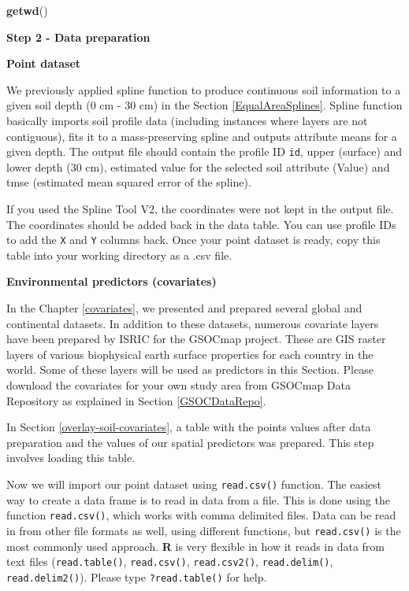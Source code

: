 \documentclass[10pt,b5paper,]{book}
\newenvironment{Shaded}{\begin{snugshade}}{\end{snugshade}}
\newcommand{\KeywordTok}[1]{\textcolor[rgb]{0.13,0.29,0.53}{\textbf{#1}}}
\newcommand{\NormalTok}[1]{#1}
\theoremstyle{definition}
\theoremstyle{definition}
\theoremstyle{definition}
\theoremstyle{remark}
\begin{document}
\begin{Shaded}
\begin{Highlighting}[]
\KeywordTok{getwd}\NormalTok{()}
\end{Highlighting}
\end{Shaded}

\textbf{Step 2 - Data preparation}

\textbf{Point dataset}

We previously applied spline function to produce continuous soil
information to a given soil depth (0 cm - 30 cm) in the Section
\ref{EqualAreaSplines}. Spline function basically imports soil profile
data (including instances where layers are not contiguous), fits it to a
mass-preserving spline and outputs attribute means for a given depth.
The output file should contain the profile ID \texttt{id}, upper
(surface) and lower depth (30 cm), estimated value for the selected soil
attribute (Value) and tmse (estimated mean squared error of the spline).

If you used the Spline Tool V2, the coordinates were not kept in the
output file. The coordinates should be added back in the data table. You
can use profile IDs to add the \texttt{X} and \texttt{Y} columns back.
Once your point dataset is ready, copy this table into your working
directory as a .csv file.

\textbf{Environmental predictors (covariates)}

In the Chapter \ref{covariates}, we presented and prepared several
global and continental datasets. In addition to these datasets, numerous
covariate layers have been prepared by ISRIC for the GSOCmap project.
These are GIS raster layers of various biophysical earth surface
properties for each country in the world. Some of these layers will be
used as predictors in this Section. Please download the covariates for
your own study area from GSOCmap Data Repository as explained in Section
\ref{GSOCDataRepo}.

In Section \ref{overlay-soil-covariates}, a table with the points values
after data preparation and the values of our spatial predictors was
prepared. This step involves loading this table.

Now we will import our point dataset using \texttt{read.csv()} function.
The easiest way to create a data frame is to read in data from a file.
This is done using the function \texttt{read.csv()}, which works with
comma delimited files. Data can be read in from other file formats as
well, using different functions, but \texttt{read.csv()} is the most
commonly used approach. \textbf{R} is very flexible in how it reads in
data from text files (\texttt{read.table()}, \texttt{read.csv()},
\texttt{read.csv2()}, \texttt{read.delim()}, \texttt{read.delim2()}).
Please type \texttt{?read.table()} for help.
\end{document}
